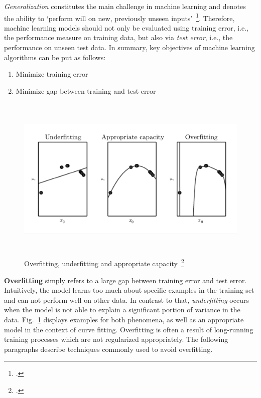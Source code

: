\textit{Generalization} constitutes the main challenge in machine learning and
denotes the ability to `perform will on new, previously unseen inputs'~\footcite[110]{Goodfellow2016}.
Therefore, machine learning models should not only be evaluated using training
error, i.e., the performance measure on training data, but also via \textit{test
error}, i.e., the performance on unseen test data.
In summary, key objectives of machine learning algorithms can be put as follows:

\begin{enumerate}
  \item Minimize training error
  \item Minimize gap between training and test error
\end{enumerate}

\begin{figure}[h]
  \includegraphics[height=8cm]{img/overfitting}
  \caption[Overfitting, underfitting and appropriate capacity]{Overfitting, underfitting and appropriate capacity~\footcite{Goodfellow2016}}
\label{fig:overfitting}
\end{figure}

\textbf{Overfitting} simply refers to a large gap between training error and test
error.
Intuitively, the model learns too much about specific examples in the training
set and can not perform well on other data.
In contrast to that, \textit{underfitting} occurs when the model is not able
to explain a significant portion of variance in the data.
Fig.~\ref{fig:overfitting} displays examples for both phenomena, as well as
an appropriate model in the context of curve fitting.
Overfitting is often a result of long-running training processes which are
not regularized appropriately.
The following paragraphs describe techniques commonly used to avoid overfitting.

